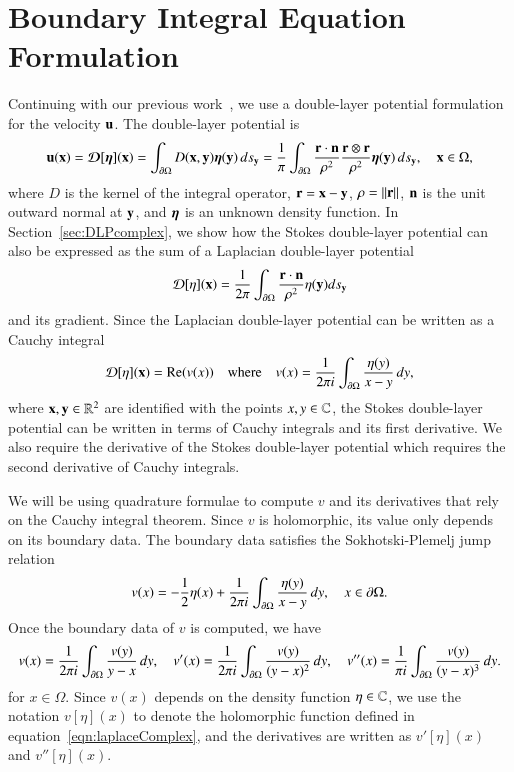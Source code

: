 \documentclass[preprint, 10pt]{elsarticle}
\begin{document}
\section{Boundary Integral Equation Formulation}
\label{s:formulation}
Continuing with our previous work~\cite{qua-moo2018}, we use a
double-layer potential formulation for the velocity ${\mathbf{u}}$.  The
double-layer potential is
\begin{align}
  {\mathbf{u}}({\mathbf{x}}) = {\boldsymbol{\mathcal D}}[{\boldsymbol\eta}]({\mathbf{x}}) = 
    \int_{{\partial}\Omega} D({\mathbf{x}},{\mathbf{y}}) {\boldsymbol\eta}({\mathbf{y}})\, ds_{\mathbf{y}} = 
  \frac{1}{\pi}\int_{{\partial}\Omega} 
    \frac{{\mathbf{r}} \cdot {\mathbf{n}}}{\rho^2} \frac{{\mathbf{r}} \otimes {\mathbf{r}}}{\rho^2}
    {\boldsymbol\eta}({\mathbf{y}}) \, ds_{\mathbf{y}}, \quad {\mathbf{x}} \in \Omega,
  \label{eqn:stokesDLP}
\end{align}
where $D$ is the kernel of the integral operator, ${\mathbf{r}} = {\mathbf{x}} - {\mathbf{y}}$,
$\rho = \|{\mathbf{r}}\|$, ${\mathbf{n}}$ is the unit outward normal at ${\mathbf{y}}$, and ${\boldsymbol\eta}$
is an unknown density function.  In Section~\ref{sec:DLPcomplex}, we
show how the Stokes double-layer potential can also be expressed as the
sum of a Laplacian double-layer potential 
\begin{align}
  {\mathcal{D}}[\eta]({\mathbf{x}}) = \frac{1}{2\pi} \int_{{\partial}\Omega}
    \frac{{\mathbf{r}} \cdot {\mathbf{n}}}{\rho^2} \eta({\mathbf{y}}) ds_{\mathbf{y}}
\end{align}
and its gradient.  Since the Laplacian double-layer potential can be
written as a Cauchy integral
\begin{align}
  {\mathcal{D}}[\eta]({\mathbf{x}}) = {\operatorname{Re}} (v(x)) \quad \text{where} \quad
  v(x) = \frac{1}{2\pi i} \int_{{\partial}\Omega}
    \frac{\eta(y)}{x - y} \, dy,
  \label{eqn:laplaceComplex}
\end{align}
where ${\mathbf{x}},{\mathbf{y}} \in {\mathbb{R}}^2$ are identified with the points $x,y \in {\mathbb{C}}$,
the Stokes double-layer potential can be written in terms of Cauchy
integrals and its first derivative.  We also require the derivative of
the Stokes double-layer potential which requires the second derivative
of Cauchy integrals.

We will be using quadrature formulae to compute $v$ and its derivatives
that rely on the Cauchy integral theorem.  Since $v$ is holomorphic, its
value only depends on its boundary data.  The boundary data satisfies
the Sokhotski-Plemelj jump relation
\begin{align}
  \label{eqn:SPrelation}
  v(x) = -\frac{1}{2} \eta(x) + \frac{1}{2\pi i} \int_{{\partial}\Omega}
    \frac{\eta(y)}{x-y}\, dy, \quad x \in {\partial}\Omega.
\end{align}
Once the boundary data of $v$ is computed, we have
\begin{align}
  \label{eqn:cauchy}
  v(x) = \frac{1}{2\pi i}\int_{{\partial}\Omega} 
    \frac{v(y)}{y-x} \,dy, \quad
  v'(x) = \frac{1}{2\pi i} \int_{{\partial}\Omega}
    \frac{v(y)}{(y-x)^2} \, dy, \quad
  v''(x) = \frac{1}{\pi i} \int_{{\partial}\Omega}
    \frac{v(y)}{(y-x)^3} \, dy.
\end{align}
for $x \in \Omega$.  Since $v(x)$ depends on the density function $\eta
\in {\mathbb{C}}$, we use the notation $v[\eta](x)$ to denote the holomorphic
function defined in equation~\eqref{eqn:laplaceComplex}, and the
derivatives are written as $v'[\eta](x)$ and $v''[\eta](x)$.
\end{document}
